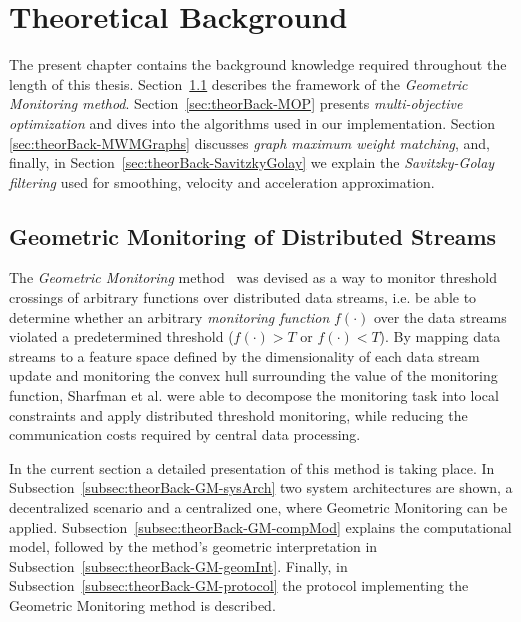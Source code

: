  \chapter{Theoretical Background} \label{chap:theorBack}

The present chapter contains the background knowledge required throughout the length of this thesis. Section~\ref{sec:theorBack-GM} describes the framework of the \emph{Geometric Monitoring method}. Section~\ref{sec:theorBack-MOP} presents \emph{multi-objective optimization} and  dives into the algorithms used in our implementation. Section \ref{sec:theorBack-MWMGraphs} discusses \emph{graph maximum weight matching}, and, finally, in Section~\ref{sec:theorBack-SavitzkyGolay} we explain the \emph{Savitzky-Golay filtering} used for smoothing, velocity and acceleration approximation.


\section{Geometric Monitoring of Distributed Streams} \label{sec:theorBack-GM}
 
The \emph{Geometric Monitoring} method~\cite{Sharfman2006GM} was devised as a way to monitor threshold crossings of arbitrary functions over distributed data streams, i.e. be able to determine whether an arbitrary \emph{monitoring function} $f(\cdot)$ over the data streams violated a predetermined threshold ($f(\cdot)>T$ or $f(\cdot)<T$). By mapping data streams to a feature space defined by the dimensionality of each data stream update and monitoring the convex hull surrounding the value of the monitoring function, Sharfman et al. were able to decompose the monitoring task into local constraints and apply distributed threshold monitoring, while reducing the communication costs required by central data processing.

In the current section a detailed presentation of this method is taking place. In Subsection~\ref{subsec:theorBack-GM-sysArch} two system architectures are shown, a decentralized scenario and a centralized one, where Geometric Monitoring can be applied. Subsection~\ref{subsec:theorBack-GM-compMod} explains the computational model, followed by the method's geometric interpretation in Subsection~\ref{subsec:theorBack-GM-geomInt}. Finally, in Subsection~\ref{subsec:theorBack-GM-protocol} the protocol implementing the Geometric Monitoring method is described.


